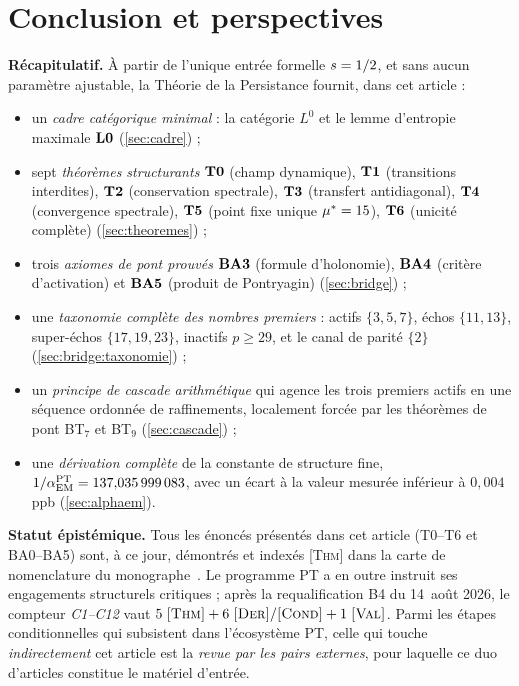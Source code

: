 \section{Conclusion et perspectives}
\label{sec:conclusion}

\textbf{Récapitulatif.} À partir de l'unique entrée formelle $s = 1/2$, et sans aucun paramètre ajustable, la Théorie de la Persistance fournit, dans cet article :
\begin{itemize}[nosep,leftmargin=*]
\item un \emph{cadre catégorique minimal} : la catégorie $L^0$ et le lemme d'entropie maximale $\textbf{L0}$ (\ref{sec:cadre}) ;
\item sept \emph{théorèmes structurants} $\textbf{T0}$ (champ dynamique), $\textbf{T1}$ (transitions interdites), $\textbf{T2}$ (conservation spectrale), $\textbf{T3}$ (transfert antidiagonal), $\textbf{T4}$ (convergence spectrale), $\textbf{T5}$ (point fixe unique $\mu^{*} = 15$), $\textbf{T6}$ (unicité complète) (\ref{sec:theoremes}) ;
\item trois \emph{axiomes de pont prouvés} $\textbf{BA3}$ (formule d'holonomie), $\textbf{BA4}$ (critère d'activation) et $\textbf{BA5}$ (produit de Pontryagin) (\ref{sec:bridge}) ;
\item une \emph{taxonomie complète des nombres premiers} : actifs $\{3, 5, 7\}$, échos $\{11, 13\}$, super-échos $\{17, 19, 23\}$, inactifs $p \geq 29$, et le canal de parité $\{2\}$ (\ref{sec:bridge:taxonomie}) ;
\item un \emph{principe de cascade arithmétique} qui agence les trois premiers actifs en une séquence ordonnée de raffinements, localement forcée par les théorèmes de pont BT$_7$ et BT$_9$ (\ref{sec:cascade}) ;
\item une \emph{dérivation complète} de la constante de structure fine, $1/\alpha_{\rm EM}^{\rm PT} = 137{,}035\,999\,083$, avec un écart à la valeur mesurée inférieur à $0{,}004$ ppb (\ref{sec:alphaem}).
\end{itemize}

\textbf{Statut épistémique.} Tous les énoncés présentés dans cet article (T0--T6 et BA0--BA5) sont, à ce jour, démontrés et indexés \textsc{[Thm]} dans la carte de nomenclature du monographe~\cite[\texttt{NOMENCLATURE\_MAP.md}]{PT_Monograph}. Le programme PT a en outre instruit ses engagements structurels critiques ; après la requalification B4 du 14~août 2026, le compteur \emph{C1--C12} vaut $5\;\textsc{[Thm]} + 6\;\textsc{[Der]}/\textsc{[Cond]} + 1\;\textsc{[Val]}$. Parmi les étapes conditionnelles qui subsistent dans l'écosystème PT, celle qui touche \emph{indirectement} cet article est la \emph{revue par les pairs externes}, pour laquelle ce duo d'articles constitue le matériel d'entrée.

